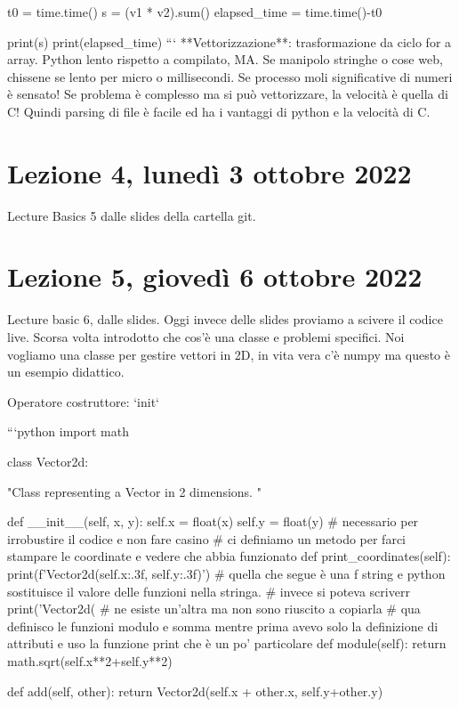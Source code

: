 \documentclass[10pt, a4paper, twosided, titlepage, draft]{book}
\begin{document}
t0 = time.time()
s = (v1 * v2).sum()
elapsed_time = time.time()-t0

print(s)
print(elapsed_time)
```
**Vettorizzazione**: trasformazione da ciclo for a array. Python lento rispetto a compilato, MA. Se manipolo stringhe o cose web, chissene se lento per micro o millisecondi. Se processo moli significative di numeri è sensato!
Se problema è complesso ma si può vettorizzare, la velocità è quella di C! Quindi parsing di file è facile ed ha i vantaggi di python e la velocità di C.


\section{Lezione 4, lunedì 3 ottobre 2022}

Lecture Basics 5 dalle slides della cartella git.


\section{Lezione 5, giovedì 6 ottobre 2022}

Lecture basic 6, dalle slides.
Oggi invece delle slides proviamo a scivere il codice live.
Scorsa volta introdotto che cos'è una classe e problemi specifici.
Noi vogliamo una classe per gestire vettori in 2D, in vita vera c'è numpy ma questo è un esempio didattico.

Operatore costruttore: `init` 

```python
import math

class Vector2d:

"Class representing a Vector in 2 dimensions.
"

def __init__(self, x, y):
self.x = float(x) 
self.y = float(y) # necessario per irrobustire il codice e non fare casino
# ci definiamo un metodo per farci stampare le coordinate e vedere che abbia funzionato
def print_coordinates(self):
print(f'Vector2d({self.x:.3f}, {self.y:.3f})')
# quella che segue è una f string e python sostituisce il valore delle funzioni nella stringa.
# invece si poteva scriverr
print('Vector2d(%
# ne esiste un'altra ma non sono riuscito a copiarla
# qua definisco le funzioni modulo e somma mentre prima avevo solo la definizione di attributi e uso la funzione print che è un po' particolare
def module(self):
return math.sqrt(self.x**2+self.y**2)

def add(self, other):
return Vector2d(self.x + other.x, self.y+other.y)
\end{document}
